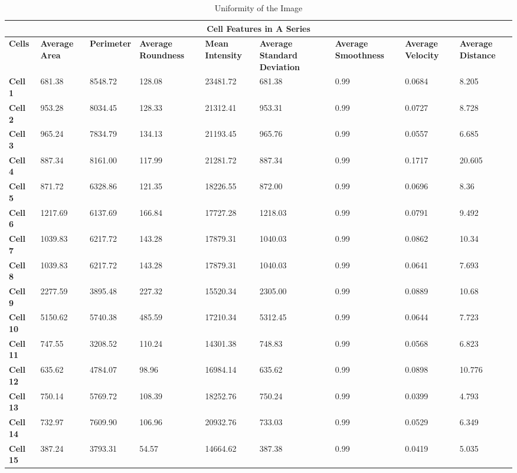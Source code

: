 \documentclass{article}
\begin{document}
\begin{table}[h!]
\centering
\begin{tabular}{|p{1.2cm}|p{1.5cm}|p{1.5cm}|p{1.5cm}|p{1.7cm}|p{1.5cm}|p{1.7cm}|p{1.5cm}|p{1.7cm}|}
\hline
\multicolumn{9}{|c|}{\textbf{Cell Features in A Series}} \\
\hline
\textbf{Cells} & \textbf{Average Area} & \textbf{Perimeter} & \textbf{Average Roundness} & \textbf{Mean Intensity} & \textbf{Average Standard Deviation} & \textbf{Average Smoothness} & \textbf{Average Velocity} & \textbf{Average Distance} \\
\hline
\textbf{Cell 1} & 681.38 & 8548.72 & 128.08 & 23481.72 & 681.38 & 0.99 & 0.0684 & 8.205 \\
\textbf{Cell 2} & 953.28 & 8034.45 & 128.33 & 21312.41 & 953.31 & 0.99 & 0.0727 & 8.728 \\
\textbf{Cell 3} & 965.24 & 7834.79 & 134.13 & 21193.45 & 965.76 & 0.99 & 0.0557 & 6.685 \\
\textbf{Cell 4} & 887.34 & 8161.00 & 117.99 & 21281.72 & 887.34 & 0.99 & 0.1717 & 20.605 \\
\textbf{Cell 5} & 871.72 & 6328.86 & 121.35 & 18226.55 & 872.00 & 0.99 & 0.0696 & 8.36 \\
\textbf{Cell 6} & 1217.69 & 6137.69 & 166.84 & 17727.28 & 1218.03 & 0.99 & 0.0791 & 9.492 \\
\textbf{Cell 7} & 1039.83 & 6217.72 & 143.28 & 17879.31 & 1040.03 & 0.99 & 0.0862 & 10.34 \\
\textbf{Cell 8} & 1039.83 & 6217.72 & 143.28 & 17879.31 & 1040.03 & 0.99 & 0.0641 & 7.693 \\
\textbf{Cell 9} & 2277.59 & 3895.48 & 227.32 & 15520.34 & 2305.00 & 0.99 & 0.0889 & 10.68 \\
\textbf{Cell 10} & 5150.62 & 5740.38 & 485.59 & 17210.34 & 5312.45 & 0.99 & 0.0644 & 7.723 \\
\textbf{Cell 11} & 747.55 & 3208.52 & 110.24 & 14301.38 & 748.83 & 0.99 & 0.0568 & 6.823 \\
\textbf{Cell 12} & 635.62 & 4784.07 & 98.96 & 16984.14 & 635.62 & 0.99 & 0.0898 & 10.776 \\
\textbf{Cell 13} & 750.14 & 5769.72 & 108.39 & 18252.76 & 750.24 & 0.99 & 0.0399 & 4.793 \\
\textbf{Cell 14} & 732.97 & 7609.90 & 106.96 & 20932.76 & 733.03 & 0.99 & 0.0529 & 6.349 \\
\textbf{Cell 15} & 387.24 & 3793.31 & 54.57 & 14664.62 & 387.38 & 0.99 & 0.0419 & 5.035 \\
\hline
\end{tabular}
\caption{Uniformity of the Image}\label{table:Uniformity}
\end{table}
\end{document}
